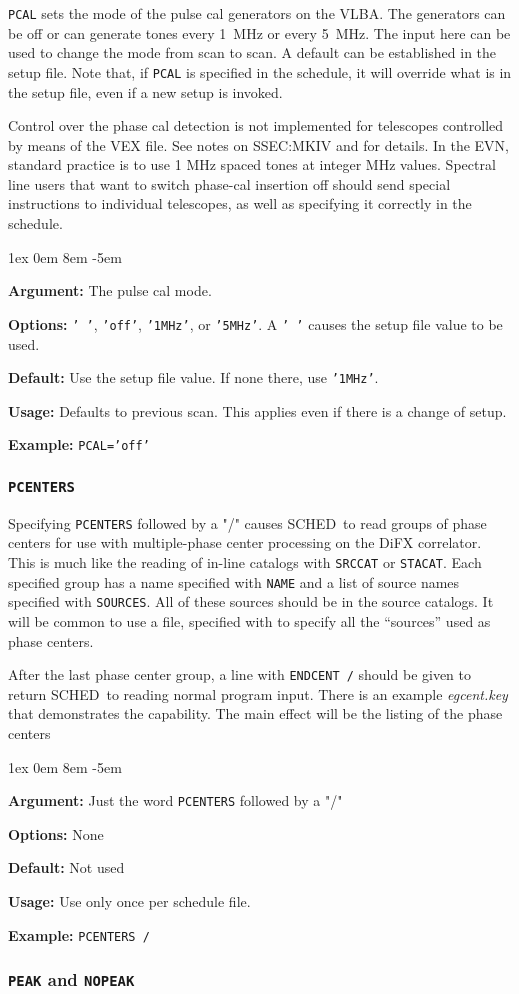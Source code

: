 \documentclass{report}
\newcommand{\schedb}{{\sc SCHED~}}
\newcommand{\rcwbox}[5]{
  \begin{list}{}{\parsep 1ex  \itemsep 0em
                 \leftmargin 8em  \itemindent -5em }
    \item {\bf Argument:} #1
    \item {\bf Options:}  #2
    \item {\bf Default:}  #3
    \item {\bf Usage:}    #4
    \item {\bf Example:}  #5
  \end{list}
}
\begin{document}
{\tt PCAL} sets the mode of the pulse cal generators on the VLBA. The
generators can be off or can generate tones every 1~MHz or every
5~MHz. The input here can be used to change the mode from scan to
scan. A default can be established in the setup file.  Note that, if
{\tt PCAL} is specified in the schedule, it will override what is
in the setup file, even if a new setup is invoked.

Control over the phase cal detection is not implemented for telescopes
controlled by means of the VEX file. See notes on 
{SSEC:MKIV} and  for details. In the EVN,
standard practice is to use 1 MHz spaced tones at integer MHz
values. Spectral line users that want to switch phase-cal insertion
off should send special instructions to individual telescopes, as well
as specifying it correctly in the schedule.

\rcwbox
{The pulse cal mode.}
{{\tt ' '}, {\tt 'off'}, {\tt '1MHz'}, or {\tt '5MHz'}. A {\tt ' '}
causes the setup file value to be used.}
{Use the setup file value. If none there, use {\tt '1MHz'}.}
{Defaults to previous scan.  This applies even if there is a change
of setup.}
{{\tt PCAL='off'}}


\subsubsection{\label{MP:PCENTERS}{\tt PCENTERS}}

Specifying {\tt PCENTERS} followed by a "/" causes \schedb to read
groups of phase centers for use with multiple-phase center processing
on the DiFX correlator.  This is much like the reading of in-line
catalogs with {\tt SRCCAT} or {\tt STACAT}.  Each specified group has
a name specified with {\tt NAME} and a list of source names specified
with {\tt SOURCES}.  All of these sources should be in the source
catalogs.  It will be common to use a file, specified with
 to specify all the ``sources''
used as phase centers.

After the last phase center group, a line with
{\tt ENDCENT /} should be given to return \schedb to reading normal
program input.  There is an example {\sl egcent.key} that demonstrates
the capability.  The main effect will be the listing of the phase
centers

\rcwbox
{Just the word {\tt PCENTERS} followed by a "/"}
{None}
{Not used}
{Use only once per schedule file.}
{{\tt PCENTERS /}}


\subsubsection{\label{MP:PEAK}{\tt PEAK} and {\tt NOPEAK}}
\end{document}
